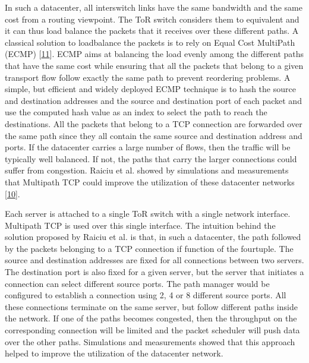 \documentclass[letterpaper,10pt,english]{sphinxmanual}
\begin{document}
\sphinxAtStartPar
In such a datacenter, all inter\sphinxhyphen{}switch links have the same bandwidth and the same cost from a routing viewpoint. The ToR switch considers them to equivalent and it can thus load balance the packets that it receives over these different paths. A classical solution to load\sphinxhyphen{}balance the packets is to rely on Equal Cost MultiPath (ECMP) {[}\hyperlink{cite.biblio:id2922}{11}{]}. ECMP aims at balancing the load evenly among the different paths that have the same cost while ensuring that all the packets that belong to a given transport flow follow exactly the same path to prevent reordering problems. A simple, but efficient and widely deployed ECMP technique is to hash the source and destination addresses and the source and destination port of each packet and use the computed hash value as an index to select the path to reach the destinations. All the packets that belong to a TCP connection are forwarded over the same path since they all contain the same source and destination address and ports. If the datacenter carries a large number of flows, then the traffic will be typically well balanced. If not, the paths that carry the larger connections could suffer from congestion. Raiciu et al. showed by simulations and measurements that Multipath TCP could improve the utilization of these datacenter networks {[}\hyperlink{cite.biblio:id8933}{10}{]}.

\sphinxAtStartPar
Each server is attached to a single ToR switch with a single network interface. Multipath TCP is used over this single interface. The intuition behind the solution proposed by Raiciu et al. is that, in such a datacenter, the path followed by the packets belonging to a TCP connection if function of the four\sphinxhyphen{}tuple. The source and destination addresses are fixed for all connections between two servers. The destination port is also fixed for a given server, but the server that initiates a connection can select different source ports. The path manager would be configured to establish a connection using 2, 4 or 8 different source ports. All these connections terminate on the same server, but follow different paths inside the network. If one of the paths becomes congested, then the throughput on the corresponding connection will be limited and the packet scheduler will push data over the other paths. Simulations and measurements showed that this approach helped to improve the utilization of the datacenter network.
\end{document}
